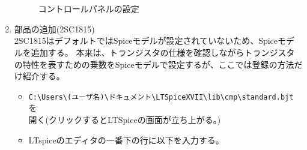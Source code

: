 \begin{enumerate}
  \begin{figure}[htb]
    \begin{center}
    \\ %
    ~
    \caption{コントロールパネルの設定} 
    \end{center}
  \end{figure}
  \newpage
  \item 部品の追加(2SC1815)\\
  2SC1815はデフォルトではSpiceモデルが設定されていないため、Spiceモデルを追加する。
    本来は、トランジスタの仕様を確認しながらトランジスタの特性を表すための乗数をSpiceモデルで設定するが、ここでは登録の方法だけ紹介する。
    \begin{itemize}
      \item \verb|C:\Users\(ユーザ名)\ドキュメント\LTSpiceXVII\lib\cmp\standard.bjt| を
      \\開く(クリックするとLTSpiceの画面が立ち上がる。)
      \item LTspiceのエディタの一番下の行に以下を入力する。

\end{itemize}
\end{enumerate}
